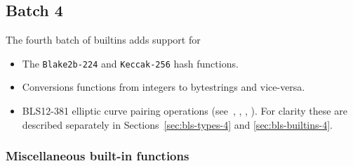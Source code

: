 \renewcommand{\note}[1]{
  \bigskip
  \refstepcounter{notenumberD}
  \noindent\textbf{Note \thenotenumberD. #1}
}

\newcommand{\itobs}{\textsf{itobs}}
\newcommand{\bstoi}{\textsf{bstoi}}

\subsection{Batch 4}
\label{sec:default-builtins-4}
The fourth batch of builtins adds support for
\begin{itemize}
\item The \texttt{Blake2b-224} and \texttt{Keccak-256} hash functions.
\item Conversions functions from integers to bytestrings and vice-versa.
\item BLS12-381 elliptic curve pairing operations
(see~\cite{CIP-0381}, \cite{BLS12-381}, \cite[4.2.1]{IETF-pairing-friendly-curves}, \cite{BLST-library}).
 For clarity these are described separately in Sections~\ref{sec:bls-types-4} and \ref{sec:bls-builtins-4}.
\end{itemize}

\subsubsection{Miscellaneous built-in functions}
\label{sec:misc-builtins-4}

